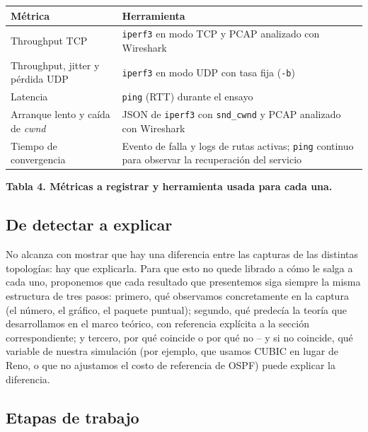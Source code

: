 \documentclass[11pt,a4paper]{article}
\newcommand{\figcaption}[1]{\par\noindent\footnotesize\textbf{#1}\par\vspace{0.4cm}}
\begin{document}
\needspace{1cm}
\begin{center}
\begin{minipage}{0.96\linewidth}
\centering
\small
\begin{tabular}{@{}p{4.3cm}p{9.3cm}@{}}
\toprule
\textbf{M\'etrica} & \textbf{Herramienta} \\
\midrule
Throughput TCP & \texttt{iperf3} en modo TCP y PCAP analizado con Wireshark \\
Throughput, jitter y p\'erdida UDP & \texttt{iperf3} en modo UDP con tasa fija (\texttt{-b}) \\
Latencia & \texttt{ping} (RTT) durante el ensayo \\
Arranque lento y ca\'ida de \textit{cwnd} & JSON de \texttt{iperf3} con \texttt{snd\_cwnd} y PCAP analizado con Wireshark \\
Tiempo de convergencia & Evento de falla y logs de rutas activas; \texttt{ping} continuo para observar la recuperaci\'on del servicio \\
\bottomrule
\end{tabular}
\par\vspace{0.1cm}
\figcaption{Tabla 4. M\'etricas a registrar y herramienta usada para cada una.}
\end{minipage}
\end{center}

\subsection*{De detectar a explicar}

No alcanza con mostrar que hay una diferencia entre las capturas de las distintas topolog\'ias: hay que explicarla. Para que esto no quede librado a c\'omo le salga a cada uno, proponemos que cada resultado que presentemos siga siempre la misma estructura de tres pasos: primero, qu\'e observamos concretamente en la captura (el n\'umero, el gr\'afico, el paquete puntual); segundo, qu\'e predec\'ia la teor\'ia que desarrollamos en el marco te\'orico, con referencia expl\'icita a la secci\'on correspondiente; y tercero, por qu\'e coincide o por qu\'e no -- y si no coincide, qu\'e variable de nuestra simulaci\'on (por ejemplo, que usamos CUBIC en lugar de Reno, o que no ajustamos el costo de referencia de OSPF) puede explicar la diferencia.

\subsection*{Etapas de trabajo}
\end{document}
